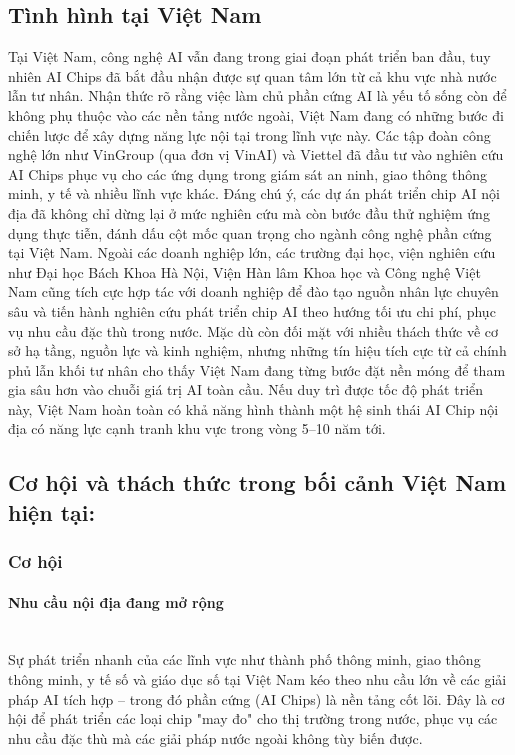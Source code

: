 \documentclass[a4paper]{article}
\begin{document}
\subsection{Tình hình tại Việt Nam}
Tại Việt Nam, công nghệ AI vẫn đang trong giai đoạn phát triển ban đầu, tuy nhiên AI Chips đã bắt đầu nhận được sự quan tâm lớn từ cả khu vực nhà nước lẫn tư nhân. Nhận thức rõ rằng việc làm chủ phần cứng AI là yếu tố sống còn để không phụ thuộc vào các nền tảng nước ngoài, Việt Nam đang có những bước đi chiến lược để xây dựng năng lực nội tại trong lĩnh vực này.
Các tập đoàn công nghệ lớn như VinGroup (qua đơn vị VinAI) và Viettel đã đầu tư vào nghiên cứu AI Chips phục vụ cho các ứng dụng trong giám sát an ninh, giao thông thông minh, y tế và nhiều lĩnh vực khác. Đáng chú ý, các dự án phát triển chip AI nội địa đã không chỉ dừng lại ở mức nghiên cứu mà còn bước đầu thử nghiệm ứng dụng thực tiễn, đánh dấu cột mốc quan trọng cho ngành công nghệ phần cứng tại Việt Nam.
Ngoài các doanh nghiệp lớn, các trường đại học, viện nghiên cứu như Đại học Bách Khoa Hà Nội, Viện Hàn lâm Khoa học và Công nghệ Việt Nam cũng tích cực hợp tác với doanh nghiệp để đào tạo nguồn nhân lực chuyên sâu và tiến hành nghiên cứu phát triển chip AI theo hướng tối ưu chi phí, phục vụ nhu cầu đặc thù trong nước.
Mặc dù còn đối mặt với nhiều thách thức về cơ sở hạ tầng, nguồn lực và kinh nghiệm, nhưng những tín hiệu tích cực từ cả chính phủ lẫn khối tư nhân cho thấy Việt Nam đang từng bước đặt nền móng để tham gia sâu hơn vào chuỗi giá trị AI toàn cầu. Nếu duy trì được tốc độ phát triển này, Việt Nam hoàn toàn có khả năng hình thành một hệ sinh thái AI Chip nội địa có năng lực cạnh tranh khu vực trong vòng 5–10 năm tới.

\subsection{Cơ hội và thách thức trong bối cảnh Việt Nam hiện tại:}
\subsubsection{Cơ hội}
\paragraph{Nhu cầu nội địa đang mở rộng}\leavevmode\\
Sự phát triển nhanh của các lĩnh vực như thành phố thông minh, giao thông thông minh, y tế số và giáo dục số tại Việt Nam kéo theo nhu cầu lớn về các giải pháp AI tích hợp – trong đó phần cứng (AI Chips) là nền tảng cốt lõi. Đây là cơ hội để phát triển các loại chip "may đo" cho thị trường trong nước, phục vụ các nhu cầu đặc thù mà các giải pháp nước ngoài không tùy biến được.
\end{document}
